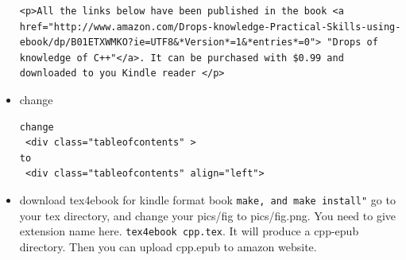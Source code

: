 \documentclass[a4paper,12pt,twoside]{book}
\begin{document}
\begin{itemize}
\begin{verbatim}
<p>All the links below have been published in the book <a href="http://www.amazon.com/Drops-knowledge-Practical-Skills-using-ebook/dp/B01ETXWMKO?ie=UTF8&*Version*=1&*entries*=0"> "Drops of knowledge of C++"</a>. It can be purchased with $0.99 and downloaded to you Kindle reader </p> 

\end{verbatim}

\item change 

\begin{verbatim}
change
 <div class="tableofcontents" >
to
 <div class="tableofcontents" align="left">
\end{verbatim}





\item download tex4ebook for kindle format book
\verb=make, and make install"=
go to your tex directory, and change your pics/fig to pics/fig.png. You need to give extension name here.
\verb=tex4ebook cpp.tex=. It will produce a cpp-epub directory. Then you can upload cpp.epub to amazon website.


		
\end{itemize}
\end{document}
